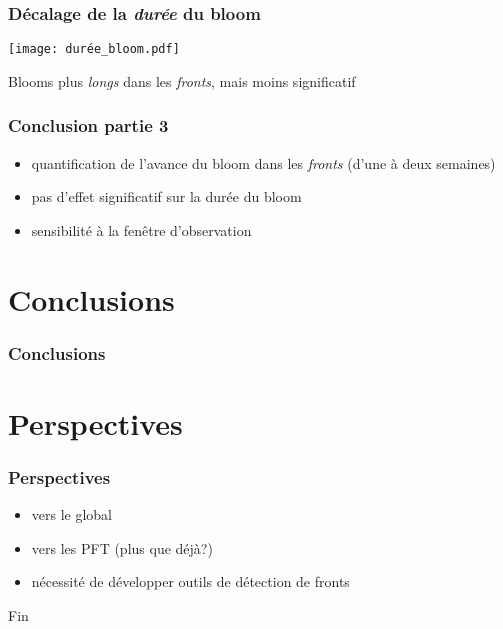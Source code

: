 \documentclass[11pt, french, aspectratio=32]{beamer}
\begin{document}
\begin{frame}
  \frametitle{Décalage de la \emph{\textit{durée}} du bloom}
  \texttt{[image: durée\_bloom.pdf]}

  \vfill

  Blooms plus \emph{longs} dans les \emph{fronts}, mais moins significatif
\end{frame}


\begin{frame}
  \frametitle{Conclusion partie 3}
  \begin{itemize}
          \setlength{\itemsep}{3em}
    \item quantification de l'avance du bloom dans les \emph{fronts} (d'une à deux semaines)
    \item pas d'effet significatif sur la durée du bloom
    \item sensibilité à la fenêtre d'observation
  \end{itemize}
\end{frame}


\section{Conclusions}

\begin{frame}
  \frametitle{Conclusions}

\end{frame}


\section{Perspectives}
\begin{frame}
  \frametitle{Perspectives}

  \begin{itemize}
    \item vers le global
    \item vers les PFT (plus que déjà?)
    \item nécessité de développer outils de détection de fronts
  \end{itemize}

\end{frame}


\begin{frame}
  Fin
\end{frame}

\appendix
\end{document}
